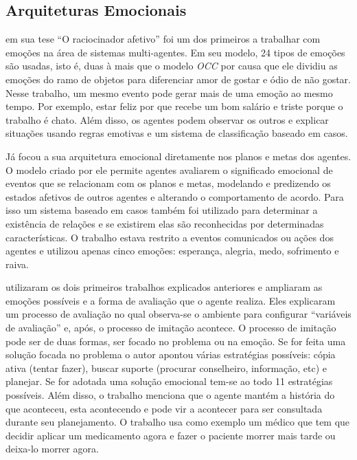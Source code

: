 \subsection{Arquiteturas Emocionais} %

\citet{elliott1992tar} em sua tese ``O raciocinador afetivo'' foi um dos
primeiros a trabalhar com emoções na área de sistemas multi-agentes. Em seu
modelo, 24 tipos de emoções são usadas, isto é, duas à mais que o modelo
\emph{OCC} por causa que ele dividiu as emoções do ramo de objetos para
diferenciar amor de gostar e ódio de não gostar. Nesse trabalho, um mesmo
evento pode gerar mais de uma emoção ao mesmo tempo. Por exemplo, estar feliz
por que recebe um bom salário e triste porque o trabalho é chato. Além disso,
os agentes podem observar os outros e explicar situações usando regras
emotivas e um sistema de classificação baseado em casos.

Já \citet{gratch2000empitae} focou a sua arquitetura emocional diretamente
nos planos e metas dos agentes. O modelo criado por ele permite agentes
avaliarem o significado emocional de eventos que se relacionam com os planos e
metas, modelando e predizendo os estados afetivos de outros agentes e
alterando o comportamento de acordo. Para isso um sistema baseado em casos
também foi utilizado para determinar a existência de relações e se existirem
elas são reconhecidas por determinadas características. O trabalho estava
restrito a eventos comunicados ou ações dos agentes e utilizou apenas cinco
emoções: esperança, alegria, medo, sofrimento e raiva.

\citet{gratch2004domain} utilizaram os dois primeiros trabalhos explicados
anteriores e ampliaram as emoções possíveis e a forma de avaliação que o
agente realiza. Eles explicaram um processo de avaliação no qual observa-se
o ambiente para configurar ``variáveis de avaliação'' e, após, o
processo de imitação acontece. O processo de imitação pode ser de duas formas,
ser focado no problema ou na emoção. Se for feita uma solução focada no
problema o autor apontou várias estratégias possíveis: cópia ativa (tentar
fazer), buscar suporte (procurar conselheiro, informação, etc) e planejar. Se
for adotada uma solução emocional tem-se ao todo 11 estratégias possíveis.
Além disso, o trabalho menciona que o agente
mantém a história do que aconteceu, esta acontecendo e pode vir a
acontecer para ser consultada durante seu planejamento. O trabalho usa como
exemplo um médico que tem que decidir aplicar um medicamento agora e fazer o
paciente morrer mais tarde ou deixa-lo morrer agora.

